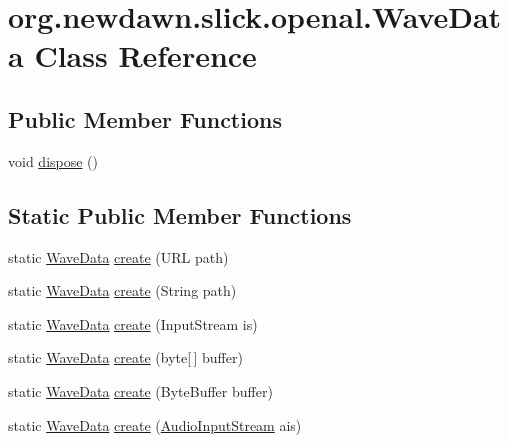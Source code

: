 \hypertarget{classorg_1_1newdawn_1_1slick_1_1openal_1_1_wave_data}{}\section{org.\+newdawn.\+slick.\+openal.\+Wave\+Data Class Reference}
\label{classorg_1_1newdawn_1_1slick_1_1openal_1_1_wave_data}
\subsection*{Public Member Functions}
\begin{DoxyCompactItemize}
\item 
void \mbox{\hyperlink{classorg_1_1newdawn_1_1slick_1_1openal_1_1_wave_data_a3dad03d37eeed32c00139e8e500eead5}{dispose}} ()
\end{DoxyCompactItemize}
\subsection*{Static Public Member Functions}
\begin{DoxyCompactItemize}
\item 
static \mbox{\hyperlink{classorg_1_1newdawn_1_1slick_1_1openal_1_1_wave_data}{Wave\+Data}} \mbox{\hyperlink{classorg_1_1newdawn_1_1slick_1_1openal_1_1_wave_data_a8848866627bc92b5a94a59b800e8627c}{create}} (U\+RL path)
\item 
static \mbox{\hyperlink{classorg_1_1newdawn_1_1slick_1_1openal_1_1_wave_data}{Wave\+Data}} \mbox{\hyperlink{classorg_1_1newdawn_1_1slick_1_1openal_1_1_wave_data_abb85adea7a217b24fc2e861140fc9f79}{create}} (String path)
\item 
static \mbox{\hyperlink{classorg_1_1newdawn_1_1slick_1_1openal_1_1_wave_data}{Wave\+Data}} \mbox{\hyperlink{classorg_1_1newdawn_1_1slick_1_1openal_1_1_wave_data_adfa138e5873fd6f146046fda1129435c}{create}} (Input\+Stream is)
\item 
static \mbox{\hyperlink{classorg_1_1newdawn_1_1slick_1_1openal_1_1_wave_data}{Wave\+Data}} \mbox{\hyperlink{classorg_1_1newdawn_1_1slick_1_1openal_1_1_wave_data_a2f465ca84f571b349028e16876182d82}{create}} (byte\mbox{[}$\,$\mbox{]} buffer)
\item 
static \mbox{\hyperlink{classorg_1_1newdawn_1_1slick_1_1openal_1_1_wave_data}{Wave\+Data}} \mbox{\hyperlink{classorg_1_1newdawn_1_1slick_1_1openal_1_1_wave_data_af22d9228455a9dae61901e46d60fdd61}{create}} (Byte\+Buffer buffer)
\item 
static \mbox{\hyperlink{classorg_1_1newdawn_1_1slick_1_1openal_1_1_wave_data}{Wave\+Data}} \mbox{\hyperlink{classorg_1_1newdawn_1_1slick_1_1openal_1_1_wave_data_a4ce1f90d7836a64815c2eaa4dd558e5e}{create}} (\mbox{\hyperlink{interfaceorg_1_1newdawn_1_1slick_1_1openal_1_1_audio_input_stream}{Audio\+Input\+Stream}} ais)
\end{DoxyCompactItemize}
